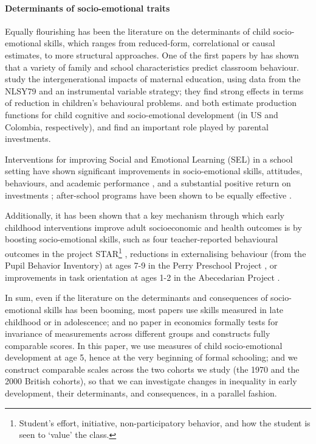 \paragraph{Determinants of socio-emotional traits} Equally flourishing has been the literature on the determinants of child socio-emotional skills, which ranges from reduced-form, correlational or causal estimates, to more structural approaches. One of the first papers by \citet{Segal2008} has shown that a variety of family and school characteristics predict classroom behaviour. \citet{Carneiro2013} study the intergenerational impacts of maternal education, using data from the NLSY79 and an instrumental variable strategy; they find strong effects in terms of reduction in children's behavioural problems. \citet{Cunha2010} and \citet{Attanasio2018a} both estimate production functions for child cognitive and socio-emotional development (in US and Colombia, respectively), and find an important role played by parental investments.

Interventions for improving Social and Emotional Learning (SEL) in a school setting have shown significant improvements in socio-emotional skills, attitudes, behaviours, and academic performance \citep{Durlak2011}, and a substantial positive return on investments \citep{Belfield2015}; after-school programs have been shown to be equally effective \citep{Durlak2010}.

Additionally, it has been shown that a key mechanism through which early childhood interventions improve adult socioeconomic and health outcomes is by boosting socio-emotional skills, such as four teacher-reported behavioural outcomes in the project STAR\footnote{Student's effort, initiative, non-participatory  behavior, and how the student is seen to `value' the class.} \citep{Chetty2011a}, reductions in externalising behaviour (from the Pupil Behavior Inventory) at ages 7-9 in the Perry Preschool Project \citep{Heckman2013,Conti2016a}, or improvements in task orientation at ages 1-2 in the Abecedarian Project \citep{Conti2016a}.

In sum, even if the literature on the determinants and consequences of socio-emotional skills has been booming, most papers use skills measured in late childhood or in adolescence; and no paper in economics formally tests for invariance of measurements across different groups and constructs fully comparable scores. In this paper, we use measures of child socio-emotional development at age 5, hence at the very beginning of formal schooling; and we construct comparable scales across the two cohorts we study (the 1970 and the 2000 British cohorts), so that we can investigate changes in inequality in early development, their determinants, and consequences, in a parallel fashion. 
